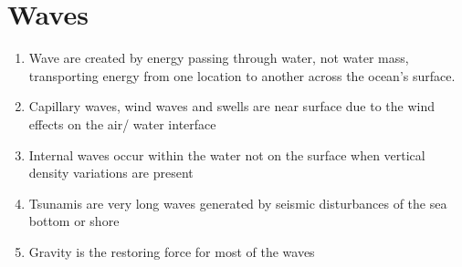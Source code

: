 \documentclass{report}
\begin{document}
\section{Waves}
\begin{enumerate}
    \item Wave are created by energy passing through water, not water mass, transporting energy from one location to another across the ocean's surface.
    \item Capillary waves, wind waves and swells are near surface due to the wind effects on the air/ water interface
    \item Internal waves occur within the water not on the surface when vertical density variations are present
    \item Tsunamis are very long waves generated by seismic disturbances of the sea bottom or shore
    \item Gravity is the restoring force for most of the waves
\end{enumerate}
\end{document}
